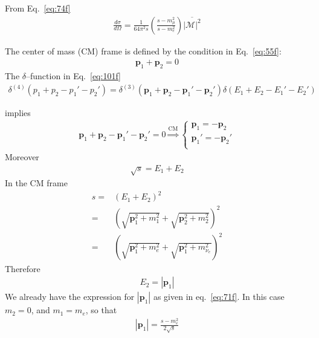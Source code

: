 From Eq.~\eqref{eq:74f}
\begin{align}
  \label{eq:103f}
  \frac{d\sigma}{d\Omega}=\frac{1}{64\pi^2s}\left(\frac{s-m_\mu^2}{s-m_e^2}\right)\overline{|\mathcal{M}|^2}
\end{align}

The center of mass (CM) frame is defined by the condition in Eq.~\eqref{eq:55f}:
\begin{align}
  \mathbf{p}_1+\mathbf{p}_2=0
\end{align}
The $\delta$--function in Eq.~\eqref{eq:101f}
\begin{align}
  \delta^{(4)}(p_1+p_2-p_1'-p_2')=\delta^{(3)}(\mathbf{p}_1+\mathbf{p}_2-\mathbf{p}_1'-\mathbf{p}_2')
\delta(E_1+E_2-E_1'-E_2')
\end{align}

implies
\begin{align}
  \label{eq:157f}
  \mathbf{p}_1+\mathbf{p}_2-\mathbf{p}_1'-\mathbf{p}_2'=0 \overset{\text{CM}}{\Rightarrow}
  \begin{cases}
    \mathbf{p}_1=-\mathbf{p}_2\\
    \mathbf{p}_1'=-\mathbf{p}_2'\\
  \end{cases}
\end{align}
Moreover
\begin{align}
  \sqrt{s}=E_1+E_2
\end{align}
In the CM frame
\begin{align}
\label{eq:104f}
s=&\left(E_1+E_2\right)^2\nonumber\\
=&\left(\sqrt{\mathbf{p}_1^2+m_1^2}+\sqrt{\mathbf{p}_2^2+m_2^2}\right)^2\nonumber\\
=&\left(\sqrt{\mathbf{p}_1^2+m_e^2}+\sqrt{\mathbf{p}_1^2+m_{\nu_e}^2}\right)^2
\end{align}
Therefore
\begin{align}
  \label{eq:105f}
  E_2=|\mathbf{p}_1|
\end{align}
We already have the expression for $|\mathbf{p}_1|$ as given in eq.~\eqref{eq:71f}. In this case $m_2=0$, and $m_1=m_e$, so that
\begin{align}
  \label{eq:158f}
  |\mathbf{p}_1|=\frac{s-m_e^2}{2\sqrt{s}}
\end{align}

